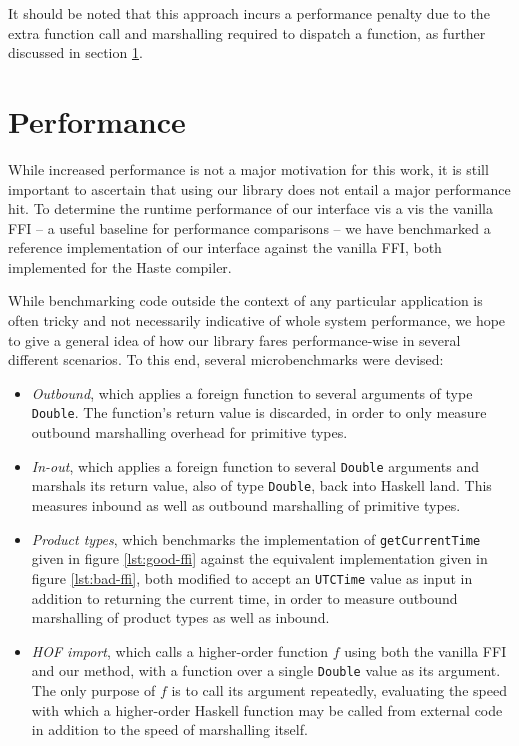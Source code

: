 \documentclass{sigplanconf}
\begin{document}
It should be noted that this approach incurs a performance penalty due to the
extra function call and marshalling required to dispatch a function, as further
discussed in section \ref{sec:performance}.


\section{Performance}
\label{sec:performance}
While increased performance is not a major motivation for this work, it is
still important to ascertain that using our library does not entail a major
performance hit. To determine the runtime performance of our interface
vis a vis the vanilla FFI -- a useful baseline for performance comparisons -- we
have benchmarked a reference implementation of our interface against the
vanilla FFI, both implemented for the Haste compiler.

While benchmarking code outside the context of any particular application is
often tricky and not necessarily indicative of whole system performance,
we hope to give a general idea of how our library fares performance-wise in
several different scenarios.
To this end, several microbenchmarks were devised:

\begin{itemize}
\item
  \emph{Outbound}, which applies a foreign function to several arguments of
  type \lstinline!Double!. The function's return value is discarded, in order
  to only measure outbound marshalling overhead for primitive types.
\item
  \emph{In-out}, which applies a foreign function to several \lstinline!Double!
  arguments and marshals its return value, also of type \lstinline!Double!,
  back into Haskell land. This measures inbound as well as outbound marshalling
  of primitive types.
\item
  \emph{Product types}, which benchmarks the implementation of\linebreak
  \lstinline!getCurrentTime! given in figure \ref{lst:good-ffi} against
  the equivalent implementation given in figure \ref{lst:bad-ffi}, both
  modified to accept an \lstinline!UTCTime! value as input in addition to
  returning the current time, in order to measure outbound marshalling of
  product types as well as inbound.
\item
  \emph{HOF import}, which calls a higher-order function $f$ using
  both the vanilla FFI and our method, with a function over a
  single \lstinline!Double! value as its argument.
  The only purpose of $f$ is to call its argument repeatedly,
  evaluating the speed with which a higher-order Haskell function may be called
  from external code in addition to the speed of marshalling itself.
\end{itemize}
\end{document}
